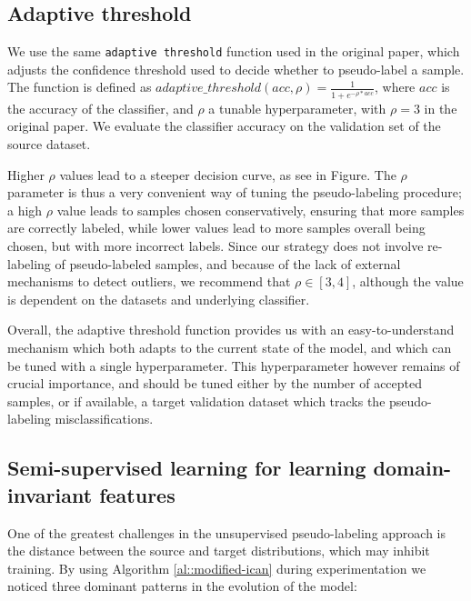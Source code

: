 \documentclass{article}
\begin{document}
	\subsection{Adaptive threshold}
	\label{ssec:threshold}
	
	We use the same \texttt{adaptive threshold} function used in the original paper, which adjusts the confidence threshold used to decide whether to pseudo-label a sample. The function is defined as $adaptive\_threshold(acc, \rho) = \frac{1}{1+e^{-\rho*acc}}$, where $acc$ is the accuracy of the classifier, and $\rho$ a tunable hyperparameter, with $\rho=3$ in the original paper. We evaluate the classifier accuracy on the validation set of the source dataset.
	
	Higher $\rho$ values lead to a steeper decision curve, as see in Figure. The $\rho$ parameter is thus a very convenient way of tuning the pseudo-labeling procedure; a high $\rho$ value leads to samples chosen conservatively, ensuring that more samples are correctly labeled, while lower values lead to more samples overall being chosen, but with more incorrect labels. Since our strategy does not involve re-labeling of pseudo-labeled samples, and because of the lack of external mechanisms to detect outliers, we recommend that $\rho \in [3,4]$, although the value is dependent on the datasets and underlying classifier.
	
	Overall, the adaptive threshold function provides us with an easy-to-understand mechanism which both adapts to the current state of the model, and which can be tuned with a single hyperparameter. This hyperparameter however remains of crucial importance, and should be tuned either by the number of accepted samples, or if available, a target validation dataset which tracks the pseudo-labeling misclassifications.
	
	
	\subsection{Semi-supervised learning for learning domain-invariant features}
	
	One of the greatest challenges in the unsupervised pseudo-labeling approach is the distance between the source and target distributions, which may inhibit training. By using Algorithm \ref{al::modified-ican} during experimentation we noticed three dominant patterns in the evolution of the model:
	
\end{document}
